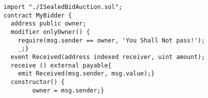 \begin{lstlisting}[language=Solidity]
import "./ISealedBidAuction.sol";
contract MyBidder {
  address public owner;
  modifier onlyOwner() {
  	require(msg.sender == owner, 'You Shall Not pass!');
    _;}
  event Received(address indexed receiver, uint amount);
  receive () external payable{
  	emit Received(msg.sender, msg.value);}
  constructor() {
        owner = msg.sender;}
\end{lstlisting}